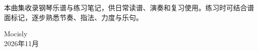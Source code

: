 本曲集收录钢琴乐谱与练习笔记，供日常读谱、演奏和复习使用。练习时可结合谱面标记，逐步熟悉节奏、指法、力度与乐句。

\begin{flushright}
Mocisly \\
2026年11月
\end{flushright}
